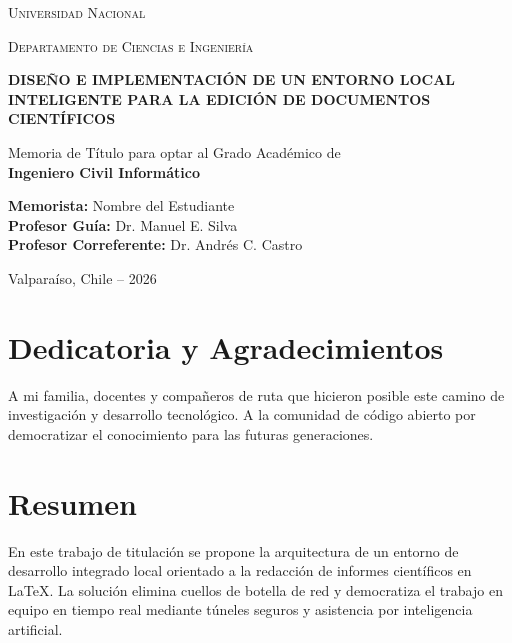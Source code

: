 \documentclass[12pt, letterpaper]{report}
\begin{document}
\begin{titlepage}
  \centering
  {\scshape\Large Universidad Nacional \par}
  {\scshape\large Departamento de Ciencias e Ingeniería \par}
  \vspace{3.5cm}

  {\Huge \bfseries \color{primary} DISEÑO E IMPLEMENTACIÓN DE UN ENTORNO LOCAL INTELIGENTE PARA LA EDICIÓN DE DOCUMENTOS CIENTÍFICOS \par}
  \vspace{1.5cm}
  {\Large Memoria de Título para optar al Grado Académico de\\ \textbf{Ingeniero Civil Informático} \par}
  \vspace{2.5cm}

  \begin{flushright}
    \large
    \textbf{Memorista:} Nombre del Estudiante \\
    \textbf{Profesor Guía:} Dr. Manuel E. Silva \\
    \textbf{Profesor Correferente:} Dr. Andrés C. Castro
  \end{flushright}

  \vfill
  {\large Valparaíso, Chile -- 2026 \par}
\end{titlepage}

\chapter*{Dedicatoria y Agradecimientos}
A mi familia, docentes y compañeros de ruta que hicieron posible este camino de investigación y desarrollo tecnológico. A la comunidad de código abierto por democratizar el conocimiento para las futuras generaciones.

\chapter*{Resumen}
En este trabajo de titulación se propone la arquitectura de un entorno de desarrollo integrado local orientado a la redacción de informes científicos en LaTeX. La solución elimina cuellos de botella de red y democratiza el trabajo en equipo en tiempo real mediante túneles seguros y asistencia por inteligencia artificial.

\tableofcontents
\listoffigures
\listoftables
\end{document}
